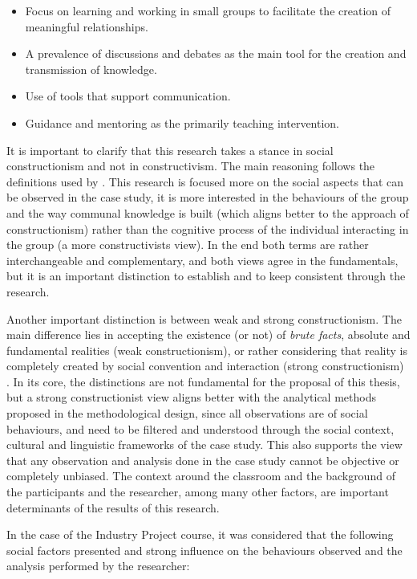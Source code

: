 \begin{itemize}
    \item Focus on learning and working in small groups to facilitate the creation of meaningful relationships.
    \item A prevalence of discussions and debates as the main tool for the creation and transmission of knowledge.
    \item Use of tools that support communication.
    \item Guidance and mentoring as the primarily teaching intervention.
\end{itemize}

It is important to clarify that this research takes a stance in social constructionism and not in constructivism. The main reasoning follows the definitions used by
\textcite{rob_2018}. This research is focused more on the social aspects that can be observed in the case study, it is more interested in the behaviours of the group and
the way communal knowledge is built (which aligns better to the approach of constructionism) rather than the cognitive process of the individual interacting in the group
(a more constructivists view). In the end both terms are rather interchangeable and complementary, and both views agree in the fundamentals, but it is an important
distinction to establish and to keep consistent through the research.

Another important distinction is between weak and strong constructionism. The main difference lies in accepting the existence (or not) of \emph{brute facts}, absolute and
fundamental realities (weak constructionism), or rather considering that reality is completely created by social convention and interaction (strong constructionism)
\parencite{travers_2004,lawson_2002}. In its core, the distinctions are not fundamental for the proposal of this thesis, but a strong constructionist view aligns better
with the analytical methods proposed in the methodological design, since all observations are of social behaviours, and need to be filtered and understood through the
social context, cultural and linguistic frameworks of the case study. This also supports the view that any observation and analysis done in the case study cannot be
objective or completely unbiased. The context around the classroom and the background of the participants and the researcher, among many other factors, are important
determinants of the results of this research.

In the case of the Industry Project course, it was considered that the following social factors presented and strong influence on the behaviours observed and the analysis performed
by the researcher:

